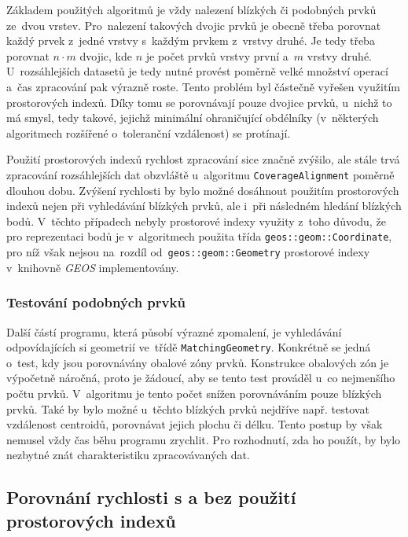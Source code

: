 Základem použitých algoritmů je vždy nalezení blízkých či podobných prvků 
ze~dvou vrstev. Pro~nalezení takových dvojic prvků je obecně třeba porovnat 
každý prvek z~jedné vrstvy s~každým prvkem z~vrstvy druhé. Je tedy třeba 
porovnat $n\cdot m$ dvojic, kde $n$ je počet prvků vrstvy první a~$m$ vrstvy 
druhé. U~rozsáhlejších datasetů je tedy nutné provést poměrně velké množství 
operací a~čas zpracování pak výrazně roste. Tento problém byl částečně vyřešen 
využitím prostorových indexů. Díky tomu se porovnávají pouze dvojice prvků, 
u~nichž to má smysl, tedy takové, jejichž minimální ohraničující obdélníky 
(v~některých algoritmech rozšířené o~toleranční vzdálenost) se protínají.

Použití prostorových indexů rychlost zpracování sice značně zvýšilo, %
ale stále trvá zpracování rozsáhlejších dat obzvláště u~algoritmu 
\texttt{CoverageAlignment} poměrně dlouhou dobu. Zvýšení rychlosti by bylo
možné dosáhnout použitím prostorových indexů nejen při vyhledávání blízkých
prvků, ale i~při následném hledání blízkých bodů. V~těchto případech nebyly
prostorové indexy využity z~toho důvodu, že pro reprezentaci bodů je
v~algoritmech použita třída \texttt{geos::geom::Coordinate}, pro níž však 
nejsou na~rozdíl od~\texttt{geos::geom::Geometry} prostorové indexy
v~knihovně \textit{GEOS} implementovány.


\subsubsection{Testování podobných prvků}

Další částí programu, která působí výrazné zpomalení, je vyhledávání
odpovídajících si geometrií ve~třídě \texttt{MatchingGeometry}. Konkrétně
se jedná o~test, kdy jsou porovnávány obalové zóny prvků. Konstrukce
obalových zón je výpočetně náročná, proto je žádoucí, aby se tento test
prováděl u~co nejmenšího počtu prvků. V~algoritmu je tento počet snížen
porovnáváním pouze blízkých prvků. Také by bylo možné u~těchto 
blízkých prvků nejdříve např. testovat vzdálenost centroidů, porovnávat
jejich plochu či délku. Tento postup by však nemusel vždy čas běhu programu
zrychlit. Pro rozhodnutí, zda ho použít, by bylo nezbytné znát charakteristiku
zpracovávaných dat.


\subsection{Porovnání rychlosti s a bez použití prostorových indexů}


